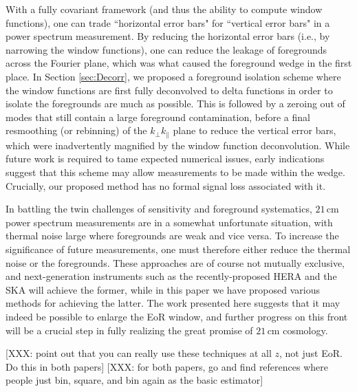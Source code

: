 \documentclass[twocolumn,aps,prd,nofootinbib,showpacs]{revtex4-1}
\begin{document}
With a fully covariant framework (and thus the ability to compute window functions), one can trade ``horizontal error bars" for ``vertical error bars" in a power spectrum measurement.  By reducing the horizontal error bars (i.e., by narrowing the window functions), one can reduce the leakage of foregrounds across the Fourier plane, which was what caused the foreground wedge in the first place.  In Section \ref{sec:Decorr}, we proposed a foreground isolation scheme where the window functions are first fully deconvolved to delta functions in order to isolate the foregrounds are much as possible.  This is followed by a zeroing out of modes that still contain a large foreground contamination, before a final resmoothing (or rebinning) of the $k_\perp k_\parallel$ plane to reduce the vertical error bars, which were inadvertently magnified by the window function deconvolution.  While future work is required to tame expected numerical issues, early indications suggest that this scheme may allow measurements to be made within the wedge.  Crucially, our proposed method has no formal signal loss associated with it.

In battling the twin challenges of sensitivity and foreground systematics, $21\,\textrm{cm}$ power spectrum measurements are in a somewhat unfortunate situation, with thermal noise large where foregrounds are weak and vice versa.  To increase the significance of future measurements, one must therefore either reduce the thermal noise or the foregrounds.  These approaches are of course not mutually exclusive, and next-generation instruments such as the recently-proposed HERA \cite{Pober2014} and the SKA will achieve the former, while in this paper we have proposed various methods for achieving the latter.  The work presented here suggests that it may indeed be possible to enlarge the EoR window, and further progress on this front will be a crucial step in fully realizing the great promise of $21\,\textrm{cm}$ cosmology.

[XXX: point out that you can really use these techniques at all $z$, not just EoR.  Do this in both papers]
[XXX: for both papers, go and find references where people just bin, square, and bin again as the basic estimator]
\end{document}
